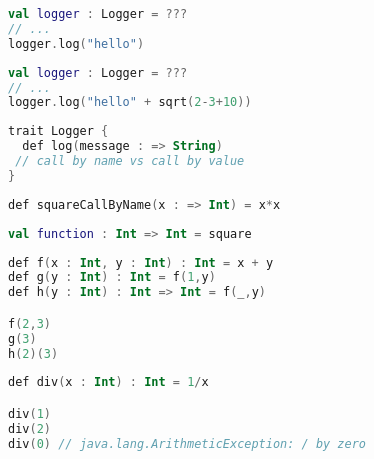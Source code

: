 \documentclass[10pt]{beamer}
\begin{document}
\begin{frame}[fragile]
\begin{lstlisting}[language=Kotlin, basicstyle=\ttfamily]
val logger : Logger = ???
// ...
logger.log("hello")  
\end{lstlisting}
\end{frame}

\begin{frame}[fragile]
\begin{lstlisting}[language=Kotlin, basicstyle=\ttfamily]
val logger : Logger = ???
// ...
logger.log("hello" + sqrt(2-3+10))  
\end{lstlisting}
\end{frame}

\begin{frame}[fragile]
\begin{lstlisting}[language=Kotlin, basicstyle=\ttfamily]
trait Logger {
  def log(message : => String) 
 // call by name vs call by value 
}
\end{lstlisting}
\end{frame}

\begin{frame}[fragile]
\begin{lstlisting}[language=Kotlin, basicstyle=\ttfamily]
def squareCallByName(x : => Int) = x*x
\end{lstlisting}
\end{frame}


\begin{frame}[fragile]
\begin{lstlisting}[language=Kotlin, basicstyle=\ttfamily]
val function : Int => Int = square
\end{lstlisting}
\end{frame}

\begin{frame}[fragile]
\begin{lstlisting}[language=Kotlin, basicstyle=\ttfamily]
def f(x : Int, y : Int) : Int = x + y
def g(y : Int) : Int = f(1,y)
def h(y : Int) : Int => Int = f(_,y)

f(2,3)
g(3)
h(2)(3)
\end{lstlisting}
\end{frame}


\begin{frame}[fragile]
\begin{lstlisting}[language=Kotlin, basicstyle=\ttfamily]
def div(x : Int) : Int = 1/x

div(1)
div(2)
div(0) // java.lang.ArithmeticException: / by zero
\end{lstlisting}
\end{frame}
\end{document}
